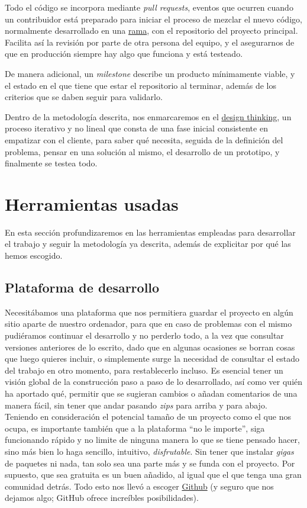 Todo el código se incorpora mediante \textit{pull requests}, eventos que ocurren cuando un contribuidor está 
preparado para iniciar el proceso de mezclar el nuevo código, normalmente desarrollado en una \href{https://docs.github.com/github/collaborating-with-issues-and-pull-requests/about-branches}{rama}, 
con el repositorio del proyecto principal. Facilita así la revisión por parte de otra persona del equipo, y el 
asegurarnos de que en producción siempre hay algo que funciona y está testeado.

De manera adicional, un \textit{milestone} describe un producto mínimamente viable, y el estado en el que tiene 
que estar el repositorio al terminar, además de los criterios que se daben seguir 
para validarlo.

Dentro de la metodología descrita, nos enmarcaremos en el \href{https://www.iebschool.com/blog/design-thinking-agile-scrum/}{design thinking}, 
un proceso iterativo y no lineal que consta de una fase inicial consistente en empatizar con el 
cliente, para saber qué necesita, seguida de la definición del problema, pensar en una solución al 
mismo, el desarrollo de un prototipo, y finalmente se testea todo. 

\section{Herramientas usadas}
En esta sección profundizaremos en las herramientas empleadas para desarrollar el trabajo y seguir 
la metodología ya descrita, además de explicitar por qué las hemos escogido.

\subsection{Plataforma de desarrollo} 
Necesitábamos una plataforma que nos permitiera guardar el proyecto en algún sitio aparte de nuestro 
ordenador, para que en caso de problemas con el mismo pudiéramos continuar el desarrollo y no perderlo 
todo, a la vez que consultar versiones anteriores de lo escrito, dado que en algunas ocasiones se borran 
cosas que luego quieres incluir, o simplemente surge la necesidad de consultar el estado del trabajo en 
otro momento, para restablecerlo incluso. Es esencial tener un visión global de la construcción paso a paso 
de lo desarrollado, así como ver quién ha aportado qué, permitir que se sugieran cambios o añadan comentarios 
de una manera fácil, sin tener que andar pasando \textit{zips} para arriba y para abajo. Teniendo en consideración 
el potencial tamaño de un proyecto como el que nos ocupa, es importante también que a la plataforma ``no le importe'', 
siga funcionando rápido y no limite de ninguna manera lo que se tiene pensado hacer, sino más bien lo haga sencillo, 
intuitivo, \textit{disfrutable}. Sin tener que instalar \textit{gigas} de paquetes ni nada, tan solo sea una parte 
más y se funda con el proyecto. Por supuesto, que sea gratuita es un buen añadido, al igual que el que tenga 
una gran comunidad detrás. Todo esto nos llevó a escoger \href{https://github.com/}{Github} (y seguro que nos 
dejamos algo; GitHub ofrece increíbles posibilidades).

